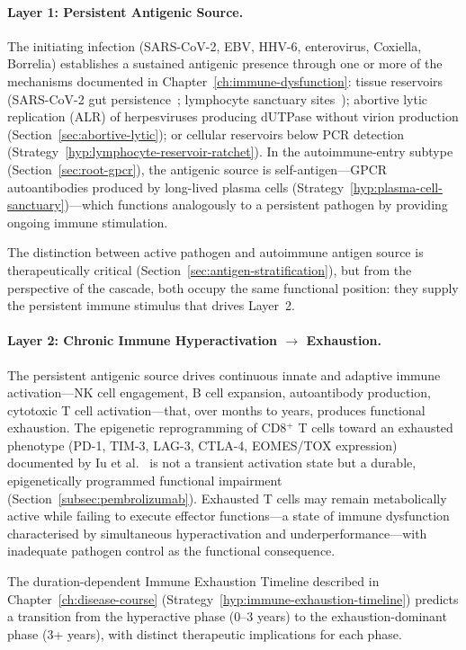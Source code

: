 \paragraph{Layer 1: Persistent Antigenic Source.} The initiating infection (SARS-CoV-2, EBV, HHV-6, enterovirus, Coxiella, Borrelia) establishes a sustained antigenic presence through one or more of the mechanisms documented in Chapter~\ref{ch:immune-dysfunction}: tissue reservoirs (SARS-CoV-2 gut persistence~\cite{Peluso2024pet}; lymphocyte sanctuary sites~\cite{Kol2026fipv}); abortive lytic replication (ALR) of herpesviruses producing dUTPase without virion production (Section~\ref{sec:abortive-lytic}); or cellular reservoirs below PCR detection (Strategy~\ref{hyp:lymphocyte-reservoir-ratchet}). In the autoimmune-entry subtype (Section~\ref{sec:root-gpcr}), the antigenic source is self-antigen---GPCR autoantibodies produced by long-lived plasma cells (Strategy~\ref{hyp:plasma-cell-sanctuary})---which functions analogously to a persistent pathogen by providing ongoing immune stimulation.

The distinction between active pathogen and autoimmune antigen source is therapeutically critical (Section~\ref{sec:antigen-stratification}), but from the perspective of the cascade, both occupy the same functional position: they supply the persistent immune stimulus that drives Layer~2.

\paragraph{Layer 2: Chronic Immune Hyperactivation $\rightarrow$ Exhaustion.} The persistent antigenic source drives continuous innate and adaptive immune activation---NK cell engagement, B cell expansion, autoantibody production, cytotoxic T cell activation---that, over months to years, produces functional exhaustion. The epigenetic reprogramming of CD8$^+$ T cells toward an exhausted phenotype (PD-1, TIM-3, LAG-3, CTLA-4, EOMES/TOX expression) documented by Iu et al.~\cite{Iu2024pnas} is not a transient activation state but a durable, epigenetically programmed functional impairment (Section~\ref{subsec:pembrolizumab}). Exhausted T cells may remain metabolically active while failing to execute effector functions---a state of immune dysfunction characterised by simultaneous hyperactivation and underperformance---with inadequate pathogen control as the functional consequence.

The duration-dependent Immune Exhaustion Timeline described in Chapter~\ref{ch:disease-course} (Strategy~\ref{hyp:immune-exhaustion-timeline}) predicts a transition from the hyperactive phase (0--3 years) to the exhaustion-dominant phase (3+ years), with distinct therapeutic implications for each phase.

